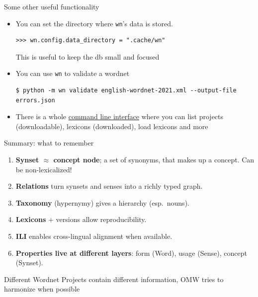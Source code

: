 \documentclass[aspectratio=169]{beamer}
\begin{document}
\begin{frame}[fragile]{Some other useful functionality}

  \begin{itemize}
  \item You can set the directory where \texttt{wn}'s data is stored.
\begin{verbatim}
>>> wn.config.data_directory = ".cache/wn"
\end{verbatim}
    This is useful to keep the db small and focused
  \item You can use \texttt{wn} to validate a wordnet
\begin{verbatim}
$ python -m wn validate english-wordnet-2021.xml --output-file errors.json
\end{verbatim}
  \item There is a whole \href{https://wn.readthedocs.io/en/latest/cli.html}{command line interface}
where you can list projects (downloadable), lexicons (downloaded), load lexicons
 and more
  \end{itemize}
  
\end{frame}


\begin{frame}{Summary: what to remember}
\begin{enumerate}
  \item \textbf{Synset $\approx$ concept node}; a set of synonyms, that makes up a concept. Can be non-lexicalized!
  \item \textbf{Relations} turn synsets and senses into a richly typed graph.
  \item \textbf{Taxonomy} (hypernymy) gives a hierarchy (esp.\ nouns).
  \item \textbf{Lexicons} + versions allow reproducibility.
  \item \textbf{ILI} enables cross-lingual alignment when available.
  \item \textbf{Properties live at different layers}: form (Word), usage (Sense), concept (Synset).
  \end{enumerate}
  
Different Wordnet Projects contain different information, OMW tries to harmonize when possible

\end{frame}
\end{document}
